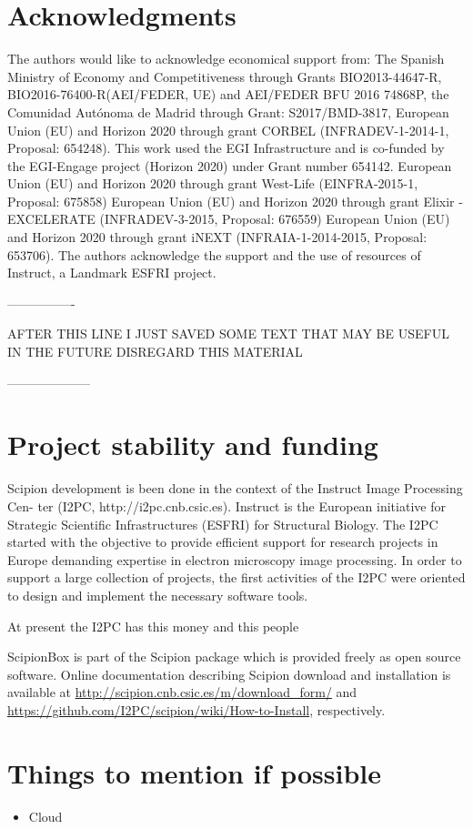 \section{Acknowledgments}

The authors would like to acknowledge economical support from:
The Spanish Ministry of Economy and Competitiveness through Grants BIO2013-44647-R, BIO2016-76400-R(AEI/FEDER, UE) and AEI/FEDER BFU 2016 74868P, the Comunidad Aut\'{o}noma de Madrid through Grant: S2017/BMD-3817, European Union (EU) and Horizon 2020 through grant CORBEL (INFRADEV-1-2014-1, Proposal: 654248). This work used the EGI Infrastructure and is co-funded by the EGI-Engage project (Horizon 2020) under Grant number 654142. European Union (EU) and Horizon 2020 through grant West-Life (EINFRA-2015-1, Proposal: 675858) European Union (EU) and Horizon 2020 through grant Elixir - EXCELERATE (INFRADEV-3-2015, Proposal: 676559) European Union (EU) and Horizon 2020 through grant iNEXT (INFRAIA-1-2014-2015, Proposal: 653706). The authors acknowledge the support and the use of resources of Instruct, a Landmark ESFRI project.

----------------

    AFTER THIS LINE I JUST SAVED SOME TEXT THAT MAY BE USEFUL IN THE FUTURE DISREGARD THIS MATERIAL

    --------------------
   


\section{Project stability and funding}


Scipion development is been done in the context of the Instruct Image Processing Cen-
ter (I2PC, http://i2pc.cnb.csic.es). Instruct is the European initiative for Strategic
Scientific Infrastructures (ESFRI) for Structural Biology. The I2PC started with the objective 
to provide efficient support for research projects in Europe demanding expertise in 
electron microscopy image processing. In order to support a large collection
of projects, the first activities of the I2PC were oriented to design and implement the
necessary software tools. 

At present the I2PC has this money and this people

ScipionBox is part of the Scipion package which is provided 
freely as open source software. Online documentation
describing Scipion download and installation is available
at \url{http://scipion.cnb.csic.es/m/download_form/} and \url{https://github.com/I2PC/scipion/wiki/How-to-Install}, respectively.

\section{Things to mention if possible}
\begin{itemize}
 \item Cloud
\end{itemize}
